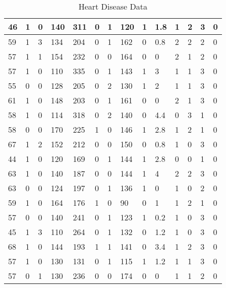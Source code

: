 \documentclass{article}
\begin{document}
\begin{table}[h!]
\begin{tabular}{|l|l|l|l|l|l|l|l|l|l|l|l|l|l|}
46 & 1 & 0 & 140 & 311 & 0 & 1 & 120 & 1 & 1.8 & 1  &2 & 3 & 0 \\ \hline
59 & 1 & 3 & 134 & 204 & 0 & 1 & 162 & 0 & 0.8 & 2  &2 & 2 & 0 \\ \hline
57 & 1 & 1 & 154 & 232 & 0 & 0 & 164 & 0 & 0 & 2  &1 & 2 & 0 \\ \hline
57 & 1 & 0 & 110 & 335 & 0 & 1 & 143 & 1 & 3 & 1  &1 & 3 & 0 \\ \hline
55 & 0 & 0 & 128 & 205 & 0 & 2 & 130 & 1 & 2 & 1  &1 & 3 & 0 \\ \hline
61 & 1 & 0 & 148 & 203 & 0 & 1 & 161 & 0 & 0 & 2  &1 & 3 & 0 \\ \hline
58 & 1 & 0 & 114 & 318 & 0 & 2 & 140 & 0 & 4.4 & 0  &3 & 1 & 0 \\ \hline
58 & 0 & 0 & 170 & 225 & 1 & 0 & 146 & 1 & 2.8 & 1  &2 & 1 & 0 \\ \hline
67 & 1 & 2 & 152 & 212 & 0 & 0 & 150 & 0 & 0.8 & 1  &0 & 3 & 0 \\ \hline
44 & 1 & 0 & 120 & 169 & 0 & 1 & 144 & 1 & 2.8 & 0  &0 & 1 & 0 \\ \hline
63 & 1 & 0 & 140 & 187 & 0 & 0 & 144 & 1 & 4 & 2  &2 & 3 & 0 \\ \hline
63 & 0 & 0 & 124 & 197 & 0 & 1 & 136 & 1 & 0 & 1  &0 & 2 & 0 \\ \hline
59 & 1 & 0 & 164 & 176 & 1 & 0 & 90 & 0 & 1 & 1  &2 & 1 & 0 \\ \hline
57 & 0 & 0 & 140 & 241 & 0 & 1 & 123 & 1 & 0.2 & 1  &0 & 3 & 0 \\ \hline
45 & 1 & 3 & 110 & 264 & 0 & 1 & 132 & 0 & 1.2 & 1  &0 & 3 & 0 \\ \hline
68 & 1 & 0 & 144 & 193 & 1 & 1 & 141 & 0 & 3.4 & 1  &2 & 3 & 0 \\ \hline
57 & 1 & 0 & 130 & 131 & 0 & 1 & 115 & 1 & 1.2 & 1  &1 & 3 & 0 \\ \hline
57 & 0 & 1 & 130 & 236 & 0 & 0 & 174 & 0 & 0 & 1  &1 & 2 & 0 \\ \hline
\end{tabular}
\caption{Heart Disease Data}
\end{table}
\end{document}
